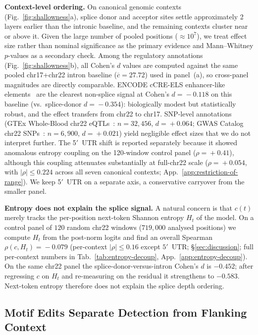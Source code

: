 \documentclass{article}
\theoremstyle{plain}
\theoremstyle{definition}
\theoremstyle{remark}
\begin{document}
\textbf{Context-level ordering.} On canonical genomic contexts (Fig.~\ref{fig:shallowness}a), splice donor and acceptor sites settle approximately 2 layers earlier than the intronic baseline, and the remaining contexts cluster near or above it. Given the large number of pooled positions ($\approx 10^7$), we treat effect size rather than nominal significance as the primary evidence and Mann--Whitney $p$-values as a secondary check. Among the regulatory annotations (Fig.~\ref{fig:shallowness}b), all Cohen's $d$ values are computed against the same pooled chr17+chr22 intron baseline ($\overline{c}\!=\!27.72$) used in panel~(a), so cross-panel magnitudes are directly comparable. ENCODE cCRE-ELS enhancer-like elements~\cite{moore2020encode} are the clearest non-splice signal at Cohen's $d\!=\!-0.118$ on this baseline (vs.\ splice-donor $d\!=\!-0.354$): biologically modest but statistically robust, and the effect transfers from chr22 to chr17. SNP-level annotations (GTEx Whole-Blood chr22 eQTLs~\cite{gtex2020}: $n\!=\!32{,}456$, $d\!=\!+0.064$; GWAS Catalog chr22 SNPs~\cite{sollis2023gwas}: $n\!=\!6{,}900$, $d\!=\!+0.021$) yield negligible effect sizes that we do not interpret further. The 5$'$~UTR shift is reported separately because it showed anomalous entropy coupling on the 120-window control panel ($\rho\!=\!+0.41$), although this coupling attenuates substantially at full-chr22 scale ($\rho\!=\!+0.054$, with $|\rho|\!\le\!0.224$ across all seven canonical contexts; App.~\ref{app:restriction-of-range}). We keep 5$'$~UTR on a separate axis, a conservative carryover from the smaller panel.

\textbf{Entropy does not explain the splice signal.} A natural concern is that $c(t)$ merely tracks the per-position next-token Shannon entropy $H_t$ of the model. On a control panel of $120$ random chr22 windows ($719{,}000$ analysed positions) we compute $H_t$ from the post-norm logits and find an overall Spearman $\rho(c, H_t)\!=\!-0.079$ (per-context $|\rho|\!\le\!0.16$ except $5'$~UTR; \S\ref{sec:discussion}; full per-context numbers in Tab.~\ref{tab:entropy-decoup}, App.~\ref{app:entropy-decoup}). On the same chr22 panel the splice-donor-versus-intron Cohen's $d$ is $-0.452$; after regressing $c$ on $H_t$ and re-measuring on the residual it strengthens to $-0.583$. Next-token entropy therefore does not explain the splice depth ordering.

\subsection{Motif Edits Separate Detection from Flanking Context}
\label{sec:motif-controls}
\end{document}
